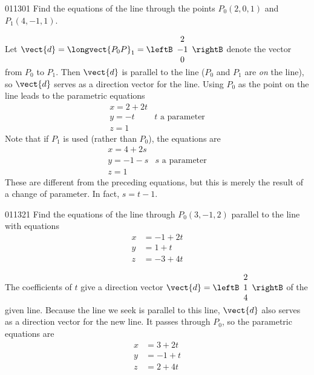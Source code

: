 \begin{example}{}{011301}
Find the equations of the line through the points $P_{0}(2, 0, 1)$ and $P_{1}(4, -1, 1)$.


\begin{solution}
  Let 
  $\vect{d} = \longvect{P_{0}P}_{1} = \leftB
  \begin{array}{c}
  2 \\
  -1 \\
  0  
  \end{array}
  \rightB$ 
  denote the vector from $P_{0}$ to $P_{1}$. Then $\vect{d}$ is parallel to the line ($P_{0}$ and $P_{1}$ are \textit{on} the line), so $\vect{d}$ serves as a direction vector for the line. Using $P_{0}$ as the point on the line leads to the parametric equations
\begin{equation*}
\begin{array}{ll}
x = 2 + 2t &\\
y = -t & t \mbox{ a parameter}\\
z = 1 &
\end{array}
\end{equation*}
Note that if $P_{1}$ is used (rather than $P_{0}$), the equations are
\begin{equation*}
\begin{array}{ll}
x = 4 + 2s &\\
y = -1 - s & s \mbox{ a parameter}\\
z = 1 &
\end{array}
\end{equation*}
These are different from the preceding equations, but this is merely the result of a change of parameter. In fact, $s = t - 1$.
\end{solution}
\end{example}

\begin{example}{}{011321}
Find the equations of the line through $P_{0}(3, -1, 2)$ parallel to the line with equations
\begin{align*}
x &= -1 + 2t \\
y &= 1 + t \\
z &= -3 + 4t 
\end{align*}

\begin{solution}
  The coefficients of $t$ give a direction vector 
  $\vect{d} = \leftB
  \begin{array}{c}
  2 \\
  1 \\
  4  
  \end{array}
  \rightB$ 
  of the given line. Because the line we seek is parallel to this line, $\vect{d}$ also serves as a direction vector for the new line. It passes through $P_{0}$, so the parametric equations are
\begin{align*}
x &= 3 + 2t \\
y &= -1 + t \\
z &= 2 + 4t 
\end{align*}
\end{solution}
\end{example}

